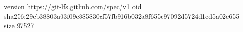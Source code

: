 version https://git-lfs.github.com/spec/v1
oid sha256:29cb38803a03f09e885830cf57fb916b032a8f655e97092d5724d1cd5a02e655
size 97527
